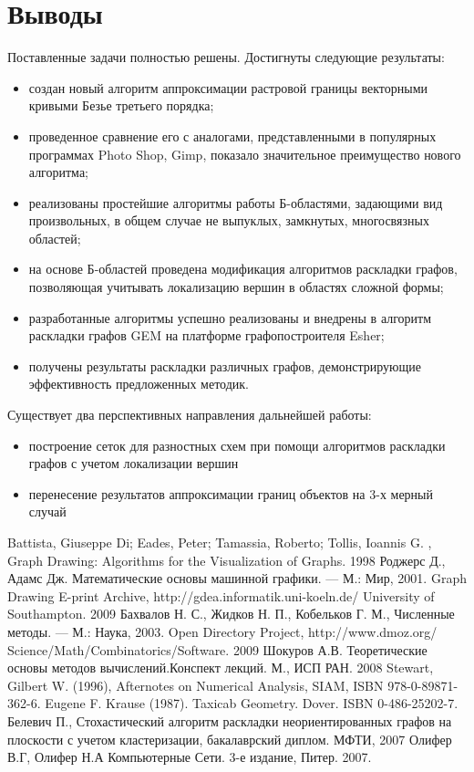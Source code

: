 \documentclass[a4paper,12pt]{report}
\begin{document}
\chapter*{Выводы}
Поставленные задачи полностью решены. Достигнуты следующие результаты:
\begin{itemize}
\item создан новый алгоритм аппроксимации растровой границы векторными кривыми Безье третьего порядка;
\item проведенное сравнение его с аналогами, представленными в популярных программах Photo Shop, Gimp, показало значительное преимущество нового алгоритма;
\item реализованы простейшие алгоритмы работы Б-областями, задающими вид произвольных, в общем случае не выпуклых, замкнутых, многосвязных областей;
\item на основе Б-областей проведена модификация алгоритмов раскладки графов, позволяющая учитывать локализацию вершин в областях сложной формы;
\item разработанные алгоритмы успешно реализованы и внедрены в алгоритм раскладки графов GEM на платформе графопостроителя Esher;
\item получены результаты раскладки различных графов, демонстрирующие эффективность предложенных методик. 
\end{itemize}

Существует два перспективных направления дальнейшей работы:
\begin{itemize}
\item построение сеток для разностных схем при помощи алгоритмов раскладки графов с учетом локализации вершин
\item перенесение результатов аппроксимации границ объектов на 3-х мерный случай
\end{itemize}


\begin{thebibliography}{99}

Battista, Giuseppe Di; Eades, Peter; Tamassia, Roberto; Tollis, Ioannis G. , Graph Drawing: Algorithms for the Visualization of Graphs. 1998
Роджерс Д., Адамс Дж. Математические основы машинной графики. — М.: Мир, 2001.
 Graph Drawing E-print Archive, http://gdea.informatik.uni-koeln.de/ University of Southampton. 2009
 Бахвалов Н. С., Жидков Н. П., Кобельков Г. М., Численные методы. — М.: Наука, 2003.
 Open Directory Project, http://www.dmoz.org/ Science/Math/Combinatorics/Software. 2009
Шокуров А.В. Теоретические основы методов вычислений.Конспект лекций. М., ИСП РАН. 2008 
Stewart, Gilbert W. (1996), Afternotes on Numerical Analysis, SIAM, ISBN 978-0-89871-362-6.
 Eugene F. Krause (1987). Taxicab Geometry. Dover. ISBN 0-486-25202-7. 
 Белевич П., Стохастический алгоритм раскладки неориентированных графов на плоскости с учетом кластеризации, бакалаврский диплом. МФТИ, 2007
Олифер В.Г, Олифер Н.А Компьютерные Сети. 3-е издание, Питер. 2007.

\end{thebibliography}
\end{document}
